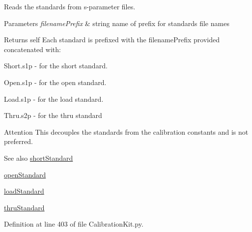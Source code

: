 Reads the standards from s-\/parameter files. 


\begin{DoxyParams}{Parameters}
{\em filename\+Prefix} & string name of prefix for standards file names \\
\hline
\end{DoxyParams}
\begin{DoxyReturn}{Returns}
self Each standard is prefixed with the filename\+Prefix provided concatenated with\+:
\begin{DoxyItemize}
\item \textquotesingle{}Short.\+s1p\textquotesingle{} -\/ for the short standard.
\item \textquotesingle{}Open.\+s1p\textquotesingle{} -\/ for the open standard.
\item \textquotesingle{}Load.\+s1p\textquotesingle{} -\/ for the load standard.
\item \textquotesingle{}Thru.\+s2p\textquotesingle{} -\/ for the thru standard 
\end{DoxyItemize}
\end{DoxyReturn}
\begin{DoxyAttention}{Attention}
This decouples the standards from the calibration constants and is not preferred. 
\end{DoxyAttention}
\begin{DoxySeeAlso}{See also}
\hyperlink{classSignalIntegrity_1_1Measurement_1_1CalKit_1_1CalibrationKit_1_1CalibrationKit_a094c01f8f3b9b22b8759481b3d5bdb85}{short\+Standard} 

\hyperlink{classSignalIntegrity_1_1Measurement_1_1CalKit_1_1CalibrationKit_1_1CalibrationKit_adfa88578140d393e4fc3d5e6976c4586}{open\+Standard} 

\hyperlink{classSignalIntegrity_1_1Measurement_1_1CalKit_1_1CalibrationKit_1_1CalibrationKit_af4b585ef48fed700d70b2bee7e5ffdbe}{load\+Standard} 

\hyperlink{classSignalIntegrity_1_1Measurement_1_1CalKit_1_1CalibrationKit_1_1CalibrationKit_a63691e31dc0a91dbcfe40635f9c87599}{thru\+Standard} 
\end{DoxySeeAlso}


Definition at line 403 of file Calibration\+Kit.\+py.

\mbox{\label{classSignalIntegrity_1_1Measurement_1_1CalKit_1_1CalibrationKit_1_1CalibrationKit_ab30dce63eb90ca31d9bea9036710996a}} 
